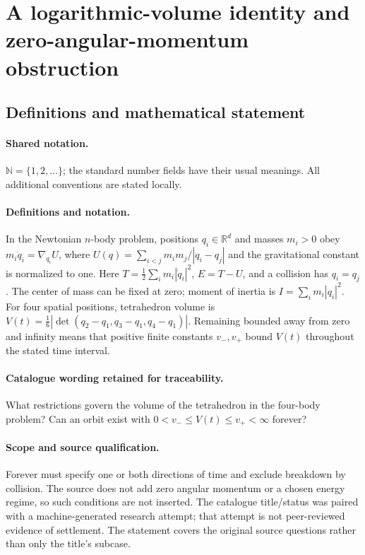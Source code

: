 \documentclass[11pt]{article}
\begin{document}
\section{A logarithmic-volume identity and zero-angular-momentum obstruction}\label{statement}

\subsection{Definitions and mathematical statement}

\paragraph{Shared notation.}$\mathbb N=\{1,2,\ldots\}$; the standard number fields have their usual meanings. All additional conventions are stated locally.


\paragraph{Definitions and notation.}In the Newtonian $n$-body problem, positions $q_i\in\mathbb R^d$ and masses $m_i>0$ obey $m_i\ddot q_i=\nabla_{q_i}U$, where $U(q)=\sum_{i<j}m_im_j/|q_i-q_j|$ and the gravitational constant is normalized to one. Here $T=\tfrac12\sum_i m_i|\dot q_i|^2$, $E=T-U$, and a collision has $q_i=q_j$. The center of mass can be fixed at zero; moment of inertia is $I=\sum_i m_i|q_i|^2$. For four spatial positions, tetrahedron volume is $V(t)=\tfrac16|\det(q_2-q_1,q_3-q_1,q_4-q_1)|$. Remaining bounded away from zero and infinity means that positive finite constants $v_-,v_+$ bound $V(t)$ throughout the stated time interval.

\paragraph{Catalogue wording retained for traceability.}
What restrictions govern the volume of the tetrahedron in the four-body problem? Can an orbit exist with $0<v_-\le V(t)\le v_+<\infty$ forever?
\paragraph{Scope and source qualification.}Forever must specify one or both directions of time and exclude breakdown by collision. The source does not add zero angular momentum or a chosen energy regime, so such conditions are not inserted. The catalogue title/status was paired with a machine-generated research attempt; that attempt is not peer-reviewed evidence of settlement. The statement covers the original source questions rather than only the title’s subcase.
\end{document}
